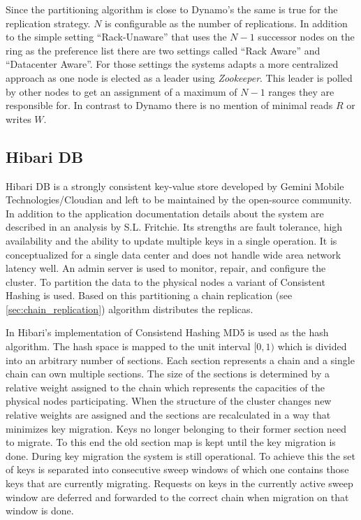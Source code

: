 Since the partitioning algorithm is close to Dynamo's the same is true for the replication strategy.
$N$ is configurable as the number of replications.
In addition to the simple setting ``Rack-Unaware'' that uses the $N-1$ successor \glspl{node} on the ring as the preference list there are two settings called ``Rack Aware'' and ``Datacenter Aware''.
For those settings the systems adapts a more centralized approach as one \gls{node} is elected as a leader using \emph{Zookeeper}\cite{Hunt2010}.
This leader is polled by other \glspl{node} to get an assignment of a maximum of $N-1$ ranges they are responsible for.
In contrast to Dynamo there is no mention of minimal reads $R$ or writes $W$.


\subsection{Hibari DB}
\label{sec:hibari}
Hibari DB\cite{Hibari2015} is a strongly consistent key-value store developed by Gemini Mobile Technologies/Cloudian and left to be maintained by the open-source community.
In addition to the application documentation details about the system are described in an analysis by S.L. Fritchie\cite{Fritchie2010}.
Its strengths are fault tolerance, high availability and the ability to update multiple keys in a single operation.
It is conceptualized for a single data center and does not handle wide area network latency well.
An admin server is used to monitor, repair, and configure the \gls{cluster}.
To partition the data to the physical \glspl{node} a variant of Consistent Hashing is used.
Based on this partitioning a chain replication (see \cref{sec:chain_replication}) algorithm distributes the replicas.

In Hibari's implementation of Consistend Hashing MD5 is used as the hash algorithm.
The hash space is mapped to the unit interval $[0, 1)$ which is divided into an arbitrary number of \glspl{section}.
Each \gls{section} represents a chain and a single chain can own multiple \glspl{section}.
The size of the \glspl{section} is determined by a relative weight assigned to the chain which represents the capacities of the physical \glspl{node} participating.
When the structure of the \gls{cluster} changes new relative weights are assigned and the \glspl{section} are recalculated in a way that minimizes key migration.
Keys no longer belonging to their former \gls{section} need to migrate.
To this end the old \gls{section} map is kept until the key migration is done.
During key migration the system is still operational.
To achieve this the set of keys is separated into consecutive sweep windows of which one contains those keys that are currently migrating.
Requests on keys in the currently active sweep window are deferred and forwarded to the correct chain when migration on that window is done.

